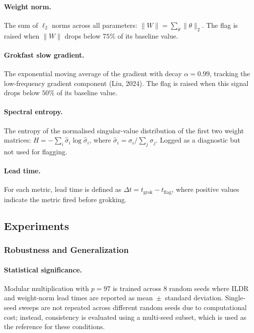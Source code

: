 \documentclass{article}
\begin{document}
\paragraph{Weight norm.}
The sum of $\ell_2$ norms across all parameters:
$\lVert W \rVert = \sum_\theta \lVert \theta \rVert_2$.
The flag is raised when $\lVert W \rVert$ drops below $75\%$ of
its baseline value.

\paragraph{Grokfast slow gradient.}
The exponential moving average of the gradient with decay
$\alpha = 0.99$, tracking the low-frequency gradient
component (Liu, 2024).
The flag is raised when this signal drops below $50\%$ of its
baseline value.

\paragraph{Spectral entropy.}
The entropy of the normalised singular-value distribution of the
first two weight matrices:
$H = -\sum_i \hat{\sigma}_i \log \hat{\sigma}_i$,
where $\hat{\sigma}_i = \sigma_i / \sum_j \sigma_j$.
Logged as a diagnostic but not used for flagging.

\paragraph{Lead time.}
For each metric, lead time is defined as
$\Delta t = t_{\mathrm{grok}} - t_{\mathrm{flag}}$,
where positive values indicate the metric fired before grokking.

\subsection{Experiments}

\subsubsection{Robustness and Generalization}

\paragraph{Statistical significance.}
Modular multiplication with $p = 97$ is trained across 8 random
seeds where ILDR and weight-norm lead times are reported as
mean~$\pm$~standard deviation. Single-seed sweeps are not repeated across different random seeds due to computational cost; instead, consistency is evaluated using a multi-seed subset, which is used as the reference for these conditions.
\end{document}
